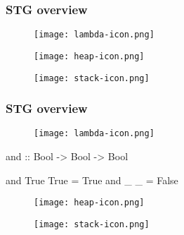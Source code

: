 \documentclass[bigger,aspectratio=169]{beamer}
\begin{document}
\begin{frame}[fragile]
\frametitle{STG overview}
\begin{center}

	\begin{minipage}{0.25\textwidth}
		\begin{figure}
			\texttt{[image: lambda-icon.png]}
		\end{figure}
	\end{minipage}
	\hfill
	\pause
	\begin{minipage}{0.30\textwidth}
		\begin{figure}
			\texttt{[image: heap-icon.png]}
		\end{figure}
	\end{minipage}
	\hfill
	\pause
	\begin{minipage}{0.30\textwidth}
		\begin{figure}
			\texttt{[image: stack-icon.png]}
		\end{figure}
	\end{minipage}

\end{center}
\end{frame}

\begin{frame}[fragile]
\frametitle{STG overview}
\begin{center}

	\begin{minipage}{0.30\textwidth}
		\vspace{1cm}
		\begin{figure}
			\texttt{[image: lambda-icon.png]}
		\end{figure}
		\begin{haskellcode}
			and :: Bool -> Bool -> Bool
		\end{haskellcode}
		\vspace{-0.4cm}
		\begin{haskellcode}
			and True True = True
			and _    _    = False
		\end{haskellcode}
	\end{minipage}
	\hfill
	\begin{minipage}{0.30\textwidth}
		\begin{figure}
			\texttt{[image: heap-icon.png]}
		\end{figure}
	\end{minipage}
	\hfill
	\begin{minipage}{0.30\textwidth}
		\begin{figure}
			\texttt{[image: stack-icon.png]}
		\end{figure}
	\end{minipage}

\end{center}
\end{frame}
\end{document}
